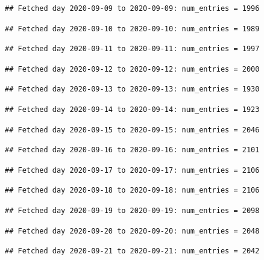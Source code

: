 \documentclass[]{article}
\begin{document}
\begin{verbatim}
## Fetched day 2020-09-09 to 2020-09-09: num_entries = 1996
\end{verbatim}

\begin{verbatim}
## Fetched day 2020-09-10 to 2020-09-10: num_entries = 1989
\end{verbatim}

\begin{verbatim}
## Fetched day 2020-09-11 to 2020-09-11: num_entries = 1997
\end{verbatim}

\begin{verbatim}
## Fetched day 2020-09-12 to 2020-09-12: num_entries = 2000
\end{verbatim}

\begin{verbatim}
## Fetched day 2020-09-13 to 2020-09-13: num_entries = 1930
\end{verbatim}

\begin{verbatim}
## Fetched day 2020-09-14 to 2020-09-14: num_entries = 1923
\end{verbatim}

\begin{verbatim}
## Fetched day 2020-09-15 to 2020-09-15: num_entries = 2046
\end{verbatim}

\begin{verbatim}
## Fetched day 2020-09-16 to 2020-09-16: num_entries = 2101
\end{verbatim}

\begin{verbatim}
## Fetched day 2020-09-17 to 2020-09-17: num_entries = 2106
\end{verbatim}

\begin{verbatim}
## Fetched day 2020-09-18 to 2020-09-18: num_entries = 2106
\end{verbatim}

\begin{verbatim}
## Fetched day 2020-09-19 to 2020-09-19: num_entries = 2098
\end{verbatim}

\begin{verbatim}
## Fetched day 2020-09-20 to 2020-09-20: num_entries = 2048
\end{verbatim}

\begin{verbatim}
## Fetched day 2020-09-21 to 2020-09-21: num_entries = 2042
\end{verbatim}
\end{document}
